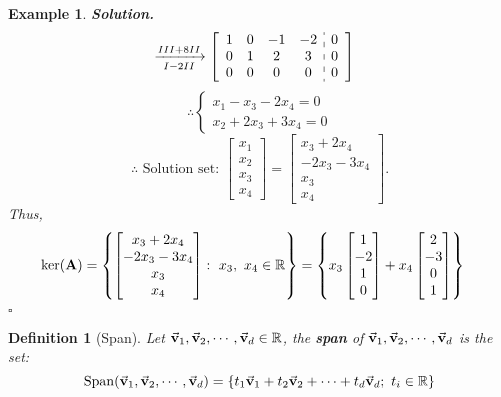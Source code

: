 \documentclass[12pt, a4paper]{article}
\newtheorem{df}{Definition}[subsection]
\newtheorem{eg}{Example}[subsection]
\newenvironment*{sol}{\par\indent\textbf{\textit{Solution. }}}{\hfill{$\square$}\par}
\def\R{{\mathbb{R}}}
\def\Span{\mathrm{Span}}
\def\vecv{\va{v}}
\def\matrixA{\vb{A}}
\begin{document}
\begin{eg}
\begin{sol}
$$\begin{aligned}
			&\xrightarrow[I-2II]{III+8II}\left[\begin{array}{c:c}\begin{matrix}1&0&-1&-2\\0&1&2&3\\0&0&0&0\end{matrix}&\begin{matrix}0\\0\\0\end{matrix}\end{array}\right]
		\end{aligned}$$
		\[\therefore\begin{cases}x_1-x_3-2x_4=0\\x_2+2x_3+3x_4=0\end{cases}\]
		$$\therefore\text{ Solution set: }\begin{bmatrix}x_1\\x_2\\x_3\\x_4\end{bmatrix}=\begin{bmatrix}x_3+2x_4\\-2x_3-3x_4\\x_3\\x_4\end{bmatrix}.$$
		Thus, $$\begin{aligned}\ker(\matrixA)&=\left\{\begin{bmatrix}x_3+2x_4\\-2x_3-3x_4\\x_3\\x_4\end{bmatrix}:\ x_3,\ x_4\in\R\right\}=\left\{x_3\begin{bmatrix}1\\-2\\1\\0\end{bmatrix}+x_4\begin{bmatrix}2\\-3\\0\\1\end{bmatrix}\right\}\end{aligned}$$
	\end{sol}
\end{eg}
\begin{df}[Span]
	Let $\vecv_1,\vecv_2,\cdots,\vecv_d\in\R$, the \textbf{span} of $\vecv_1,\vecv_2,\cdots,\vecv_d$ is the set: 
	\[\Span(\vecv_1,\vecv_2,\cdots,\vecv_d)=\left\{t_1\vecv_1+t_2\vecv_2+\cdots+t_d\vecv_d;\  t_i\in\R\right\}\]
\end{df}
\end{document}
